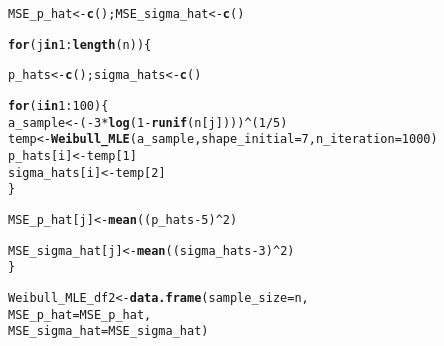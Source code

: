 \documentclass[11pt, a4paper]{article}\usepackage[]{graphicx}\usepackage[]{xcolor}
\makeatletter
\newcommand{\hlnum}[1]{\textcolor[rgb]{0.686,0.059,0.569}{#1}}%
\newcommand{\hlopt}[1]{\textcolor[rgb]{0,0,0}{#1}}%
\newcommand{\hldef}[1]{\textcolor[rgb]{0.345,0.345,0.345}{#1}}%
\newcommand{\hlkwa}[1]{\textcolor[rgb]{0.161,0.373,0.58}{\textbf{#1}}}%
\newcommand{\hlkwb}[1]{\textcolor[rgb]{0.69,0.353,0.396}{#1}}%
\newcommand{\hlkwc}[1]{\textcolor[rgb]{0.333,0.667,0.333}{#1}}%
\newcommand{\hlkwd}[1]{\textcolor[rgb]{0.737,0.353,0.396}{\textbf{#1}}}%
\newenvironment{kframe}{%
 \def\at@end@of@kframe{}%
 \ifinner\ifhmode%
  \def\at@end@of@kframe{\end{minipage}}%
  \begin{minipage}{\columnwidth}%
 \fi\fi%
 \def\FrameCommand##1{\hskip\@totalleftmargin \hskip-\fboxsep
 \colorbox{shadecolor}{##1}\hskip-\fboxsep
     \hskip-\linewidth \hskip-\@totalleftmargin \hskip\columnwidth}%
 \MakeFramed {\advance\hsize-\width
   \@totalleftmargin\z@ \linewidth\hsize
   \@setminipage}}%
 {\par\unskip\endMakeFramed%
 \at@end@of@kframe}
\newenvironment{knitrout}{}{} %
\makeatother
\begin{document}
\begin{knitrout}
\color{fgcolor}\begin{kframe}
\begin{alltt}
\hldef{MSE_p_hat} \hlkwb{<-} \hlkwd{c}\hldef{(); MSE_sigma_hat} \hlkwb{<-} \hlkwd{c}\hldef{()}
\end{alltt}
\end{kframe}
\end{knitrout}

\begin{knitrout}
\color{fgcolor}\begin{kframe}
\begin{alltt}
\hlkwa{for}\hldef{(j} \hlkwa{in} \hlnum{1}\hlopt{:}\hlkwd{length}\hldef{(n))\{}

  \hldef{p_hats} \hlkwb{<-} \hlkwd{c}\hldef{(); sigma_hats} \hlkwb{<-} \hlkwd{c}\hldef{()}

  \hlkwa{for} \hldef{(i} \hlkwa{in} \hlnum{1}\hlopt{:}\hlnum{100}\hldef{) \{}
    \hldef{a_sample} \hlkwb{<-} \hldef{(}\hlopt{-} \hlnum{3} \hlopt{*} \hlkwd{log}\hldef{(}\hlnum{1} \hlopt{-} \hlkwd{runif}\hldef{(n[j])))}\hlopt{^}\hldef{(}\hlnum{1}\hlopt{/}\hlnum{5}\hldef{)}
    \hldef{temp} \hlkwb{<-} \hlkwd{Weibull_MLE}\hldef{(a_sample,} \hlkwc{shape_initial} \hldef{=} \hlnum{7}\hldef{,} \hlkwc{n_iteration} \hldef{=} \hlnum{1000}\hldef{)}
    \hldef{p_hats[i]} \hlkwb{<-} \hldef{temp[}\hlnum{1}\hldef{]}
    \hldef{sigma_hats[i]} \hlkwb{<-} \hldef{temp[}\hlnum{2}\hldef{]}
  \hldef{\}}

  \hldef{MSE_p_hat[j]} \hlkwb{<-} \hlkwd{mean}\hldef{( (p_hats} \hlopt{-} \hlnum{5}\hldef{)}\hlopt{^}\hlnum{2} \hldef{)}

  \hldef{MSE_sigma_hat[j]} \hlkwb{<-} \hlkwd{mean}\hldef{( (sigma_hats} \hlopt{-} \hlnum{3}\hldef{)}\hlopt{^}\hlnum{2} \hldef{)}
\hldef{\}}
\end{alltt}
\end{kframe}
\end{knitrout}

\begin{knitrout}
\color{fgcolor}\begin{kframe}
\begin{alltt}
\hldef{Weibull_MLE_df2} \hlkwb{<-} \hlkwd{data.frame}\hldef{(}\hlkwc{sample_size} \hldef{= n,}
                            \hlkwc{MSE_p_hat} \hldef{= MSE_p_hat,}
                            \hlkwc{MSE_sigma_hat} \hldef{= MSE_sigma_hat)}
\end{alltt}
\end{kframe}
\end{knitrout}
\end{document}
